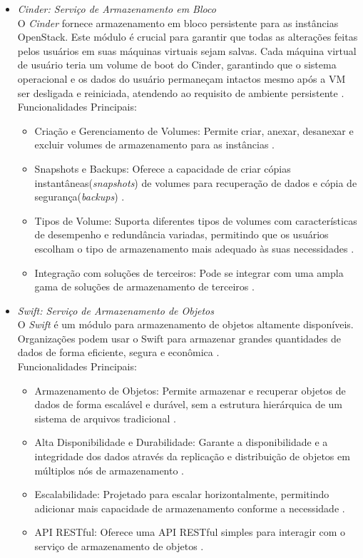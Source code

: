 \begin{itemize}
\begin{itemize}
    \item \emph{Cinder: Serviço de Armazenamento em Bloco}\\
    O  \textit{Cinder} fornece armazenamento em bloco persistente para as instâncias OpenStack. Este módulo é crucial para garantir que todas as alterações feitas pelos usuários em suas máquinas virtuais sejam salvas. Cada máquina virtual de usuário teria um volume de boot do Cinder, garantindo que o sistema operacional e os dados do usuário permaneçam intactos mesmo após a VM ser desligada e reiniciada, atendendo ao requisito de ambiente persistente \cite{openstack_cinder}.\\
    Funcionalidades Principais:
    \begin{itemize}
        \item Criação e Gerenciamento de Volumes: Permite criar, anexar, desanexar e excluir volumes de armazenamento para as instâncias \cite{openstack_cinder}.
        \item Snapshots e Backups: Oferece a capacidade de criar cópias instantâneas(\textit{snapshots}) de volumes para recuperação de dados e cópia de segurança(\textit{backups}) \cite{openstack_cinder}.
        \item Tipos de Volume: Suporta diferentes tipos de volumes com características de desempenho e redundância variadas, permitindo que os usuários escolham o tipo de armazenamento mais adequado às suas necessidades \cite{openstack_cinder}.
        \item Integração com  soluções de terceiros: Pode se integrar com uma ampla gama de soluções de armazenamento de terceiros \cite{openstack_cinder}.
    \end{itemize}

    \item \emph{Swift: Serviço de Armazenamento de Objetos}\\
    O  \textit{Swift} é um módulo para armazenamento de objetos altamente disponíveis. Organizações podem usar o Swift para armazenar grandes quantidades de dados de forma eficiente, segura e econômica \cite{openstack_swift}.\\
    Funcionalidades Principais:
    \begin{itemize}
        \item Armazenamento de Objetos: Permite armazenar e recuperar objetos de dados de forma escalável e durável, sem a estrutura hierárquica de um sistema de arquivos tradicional \cite{openstack_swift}.
        \item Alta Disponibilidade e Durabilidade: Garante a disponibilidade e a integridade dos dados através da replicação e distribuição de objetos em múltiplos nós de armazenamento  \cite{openstack_swift}.
        \item Escalabilidade: Projetado para escalar horizontalmente, permitindo adicionar mais capacidade de armazenamento conforme a necessidade  \cite{openstack_swift}.
        \item API RESTful: Oferece uma API RESTful simples para interagir com o serviço de armazenamento de objetos  \cite{openstack_swift}.
    \end{itemize}
\end{itemize}


\end{itemize}
